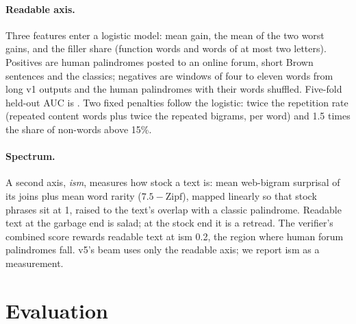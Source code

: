 \documentclass[11pt]{article}
\begin{document}
\paragraph{Readable axis.} Three features enter a logistic model: mean gain, the mean of the two worst gains, and the filler share (function words and words of at most two letters). Positives are \anchorReddit{} human palindromes posted to an online forum, \anchorBrown{} short Brown sentences and the \anchorClassics{} classics; negatives are \anchorVOneWindows{} windows of four to eleven words from \anchorVOneOutputs{} long v1 outputs and the \anchorShuffled{} human palindromes with their words shuffled. Five-fold held-out AUC is \verifierAUC{}. Two fixed penalties follow the logistic: twice the repetition rate (repeated content words plus twice the repeated bigrams, per word) and 1.5 times the share of non-words above 15\%.

\paragraph{Spectrum.} A second axis, \emph{ism}, measures how stock a text is: mean web-bigram surprisal of its joins \citep{norvig-2009-ngrams} plus mean word rarity ($7.5-\text{Zipf}$), mapped linearly so that stock phrases sit at 1, raised to the text's overlap with a classic palindrome. Readable text at the garbage end is salad; at the stock end it is a retread. The verifier's combined score rewards readable text at ism 0.2, the region where human forum palindromes fall. v5's beam uses only the readable axis; we report ism as a measurement.

\section{Evaluation}\label{sec:eval}
\end{document}
